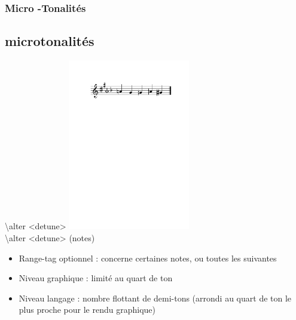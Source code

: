 \documentclass[12pt]{beamer}
\newenvironment{code}
  {\fontfamily{prc}\selectfont}{}
\begin{document}
    \begin{frame}
    \frametitle{Micro -Tonalités}
    \subsection{microtonalités}

    \begin{code} \textbackslash{}alter \textless{}detune\textgreater{} \end{code} \hspace{2cm} \vspace{-1cm} \includegraphics[width=5.3cm]{img/partitions/freekey.pdf} \\
    \begin{code} \textbackslash{}alter \textless{}detune\textgreater{} (notes) \end{code}
    
    
    \vspace{10mm}
    
    \begin{itemize}
      \item Range-tag optionnel : concerne certaines notes, ou toutes les suivantes
      \item Niveau graphique : limité au quart de ton
      \item Niveau langage : nombre flottant de demi-tons (arrondi au quart de ton le plus proche pour le rendu graphique)
    \end{itemize}
    
    \end{frame}
    
\end{document}
